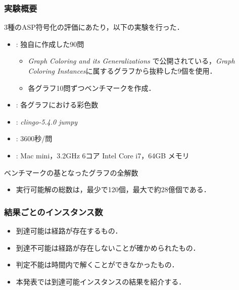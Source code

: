 \documentclass[dvipdfmx,11pt]{beamer}
\begin{document}
\begin{frame}\frametitle{実験概要}

  3種のASP符号化の評価にあたり，以下の実験を行った．
  \begin{itemize}
    \item {}: 独自に作成した90問
    \begin{itemize}
      \item \textit{Graph Coloring and its Generalizations}
      で公開されている，\textit{Graph Coloring Instances}に属するグラフから抜粋した9個を使用．
      \item 各グラフ10問ずつベンチマークを作成．
    \end{itemize}
    \item {}: 各グラフにおける彩色数

    \item {}: \textit{clingo-5.4.0} \textit{jumpy}
    \item {}: 3600秒/問
    \item {}: Mac mini，3.2GHz 6コア Intel Core i7，64GB メモリ
  \end{itemize}
  
\end{frame}


\begin{frame}{ベンチマークの基となったグラフの全解数}

  \begin{table}[t]
    \centering
    
  \end{table}

  \begin{itemize}
    \item 実行可能解の総数は，最少で120個，最大で約28億個である．
  \end{itemize}

\end{frame}


\begin{frame}\frametitle{結果ごとのインスタンス数}

  \begin{table}[t]
    \centering
    
  \end{table}
  
  \begin{itemize}
    \item 到達可能は経路が存在するもの．
    \item 到達不可能は経路が存在しないことが確かめられたもの．
    \item 判定不能は時間内で解くことができなかったもの．
    \item 本発表では到達可能インスタンスの結果を紹介する．
  \end{itemize}

\end{frame}
\end{document}
